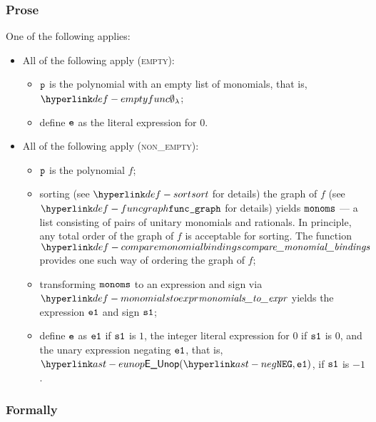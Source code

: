 \subsubsection{Prose}
One of the following applies:
\begin{itemize}
  \item All of the following apply (\textsc{empty}):
  \begin{itemize}
    \item $\texttt{p}$ is the polynomial with an empty list of monomials, that is, $\emptyfunc$;
    \item define $\texttt{e}$ as the literal expression for $0$.
  \end{itemize}

  \item All of the following apply (\textsc{non\_empty}):
  \begin{itemize}
    \item $\texttt{p}$ is the polynomial $f$;
    \item sorting (see $\sort$ for details) the graph of $f$ (see $\funcgraph$ for details)
          yields $\texttt{monoms}$ --- a list consisting of pairs of unitary monomials and rationals.
          In principle, any total order of the graph of $f$ is acceptable for sorting.
          The function $\comparemonomialbindings$ provides one such way of ordering
          the graph of $f$;
    \item transforming $\texttt{monoms}$ to an expression and sign via $\monomialstoexpr$ yields the expression $\texttt{e1}$
          and sign $\texttt{s1}$;
    \item define $\texttt{e}$ as $\texttt{e1}$ if $\texttt{s1}$ is $1$, the integer literal expression for $0$ if $\texttt{s1}$ is $0$,
          and the unary expression negating $\texttt{e1}$, that is,
          $\EUnop(\NEG, \veone)$, if $\texttt{s1}$ is $-1$.
  \end{itemize}
\end{itemize}

\subsubsection{Formally}

